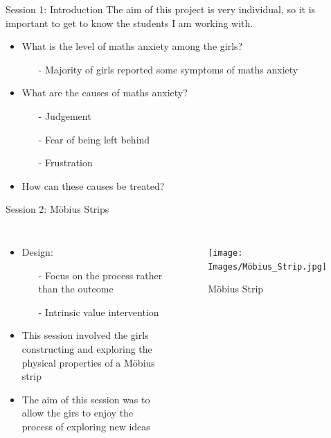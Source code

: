 \documentclass{beamer}  %
\begin{document}
\begin{frame}{Session 1: Introduction}
    The aim of this project is very individual, so it is important to get to know the students I am working with.
    \begin{itemize}
        \item What is the level of maths anxiety among the girls?
        \begin{itemize}
            \item[-]Majority of girls reported some symptoms of maths anxiety
        \end{itemize}
        \item What are the causes  of maths anxiety?
        \begin{itemize}
            \item[-] Judgement
            \item[-] Fear of being left behind
            \item[-] Frustration
        \end{itemize}
        \item How can these causes be treated?
    \end{itemize}
\end{frame}

\begin{frame}{Session 2: M\"{o}bius Strips}

    \begin{columns}
        \begin{itemize}
            \item Design:
            \begin{itemize}
                \item[-] Focus on the process rather than the outcome
                \item[-] Intrinsic value intervention
            \end{itemize} 
            \item This session involved the girls constructing and exploring the physical properties of a M\"{o}bius strip
            \item The aim of this session was to allow the girs to enjoy the process of exploring new ideas 
            
        \end{itemize}
        \begin{figure}
            \texttt{[image: Images/Möbius\_Strip.jpg]}
            \caption{M\"{o}bius Strip}
        \end{figure}
    \end{columns}
\end{frame}
\end{document}

